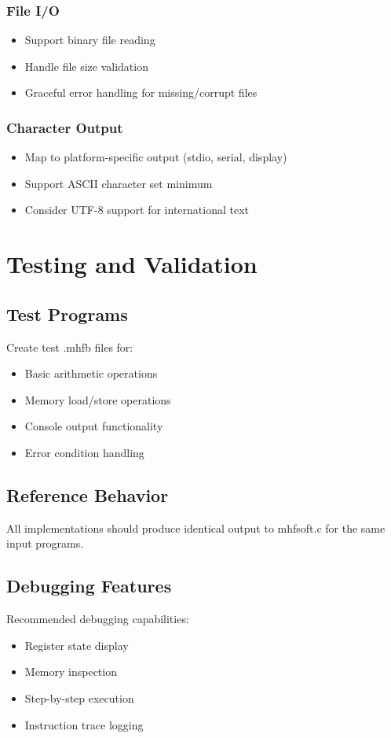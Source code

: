 \documentclass[a4paper,12pt]{article}
\begin{document}
\subsubsection{File I/O}
\begin{itemize}
    \item Support binary file reading
    \item Handle file size validation
    \item Graceful error handling for missing/corrupt files
\end{itemize}

\subsubsection{Character Output}
\begin{itemize}
    \item Map to platform-specific output (stdio, serial, display)
    \item Support ASCII character set minimum
    \item Consider UTF-8 support for international text
\end{itemize}

\section{Testing and Validation}

\subsection{Test Programs}
Create test .mhfb files for:
\begin{itemize}
    \item Basic arithmetic operations
    \item Memory load/store operations
    \item Console output functionality
    \item Error condition handling
\end{itemize}

\subsection{Reference Behavior}
All implementations should produce identical output to mhfsoft.c for the same input programs.

\subsection{Debugging Features}
Recommended debugging capabilities:
\begin{itemize}
    \item Register state display
    \item Memory inspection
    \item Step-by-step execution
    \item Instruction trace logging
\end{itemize}
\end{document}
